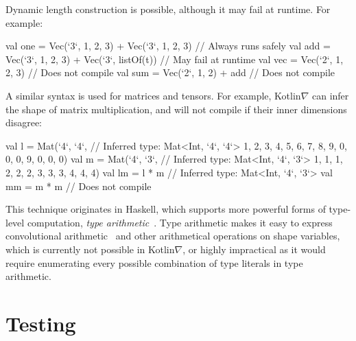 \documentclass[12pt,initial,twoside,maitrise]{dms}
\numberwithin{equation}{section}
\numberwithin{table}{chapter}
\numberwithin{figure}{chapter}
\begin{document}
%
Dynamic length construction is possible, although it may fail at runtime. For example:
%
\begin{kotlinlisting}
val one = Vec(`3`, 1, 2, 3) + Vec(`3`, 1, 2, 3)   // Always runs safely
val add = Vec(`3`, 1, 2, 3) + Vec(`3`, listOf(t)) // May fail at runtime
val vec = Vec(`2`, 1, 2, 3)                       // Does not compile
val sum = Vec(`2`, 1, 2) + add                    // Does not compile
\end{kotlinlisting}
%
A similar syntax is used for matrices and tensors. For example, Kotlin$\nabla$ can infer the shape of matrix multiplication, and will not compile if their inner dimensions disagree:
%
\begin{kotlinlisting}
val l = Mat(`4`, `4`, // Inferred type: Mat<Int, `4`, `4`>
             1, 2, 3, 4,
             5, 6, 7, 8,
             9, 0, 0, 0,
             9, 0, 0, 0)
val m = Mat(`4`, `3`, // Inferred type: Mat<Int, `4`, `3`>
             1, 1, 1,
             2, 2, 2,
             3, 3, 3,
             4, 4, 4)
val lm = l * m // Inferred type: Mat<Int, `4`, `3`>
val mm = m * m // Does not compile
\end{kotlinlisting}
%
This technique originates in Haskell, which supports more powerful forms of type-level computation, \textit{type arithmetic}~\citep{kiselyov2005number}. Type arithmetic makes it easy to express convolutional arithmetic~\citep{dumoulin2016guide} and other arithmetical operations on shape variables, which is currently not possible in Kotlin$\nabla$, or highly impractical as it would require enumerating every possible combination of type literals in type arithmetic.

\section{Testing}\label{sec:testing}
\end{document}

